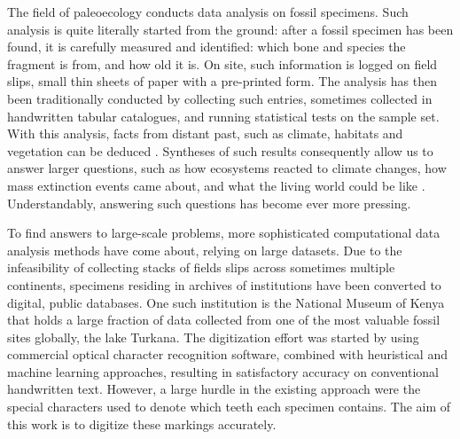 \documentclass{article}
\begin{document}
The field of paleoecology conducts data analysis on fossil specimens.
Such analysis is quite literally started from the ground: after a fossil specimen has been found, it is 
carefully measured and identified: which bone and species the fragment is from, and how old it is. On site, such information is logged on field slips, small thin sheets of 
paper with a pre-printed form. The analysis has then been traditionally conducted by 
collecting such entries, sometimes collected in handwritten tabular catalogues, and running statistical 
tests on the sample set. With this analysis, facts from distant past, such as climate, habitats and 
vegetation can be deduced \cite{Faith_Lyman_2019}. Syntheses of such results consequently allow us to 
answer larger questions, such as how ecosystems reacted to climate changes, how mass extinction events 
came about, and what the living world could be like \cite{Žliobaitė2023}. Understandably, answering such 
questions has become ever more pressing.


To find answers to large-scale problems, more sophisticated computational data analysis methods have come about,
relying on large datasets. Due to the infeasibility of collecting stacks of fields slips across sometimes multiple 
continents, specimens residing in archives of institutions have been converted to digital, public databases.
One such institution is the National Museum of Kenya that holds a large fraction of data collected from one 
of the most valuable fossil sites globally, the lake Turkana. The digitization effort was started by
using commercial optical character recognition software, combined with heuristical and machine learning approaches, 
resulting in satisfactory accuracy on conventional handwritten text. However, a large hurdle in the existing 
approach were the special characters used to denote which teeth each specimen contains. The aim of this work is 
to digitize these markings accurately.

\end{document}
